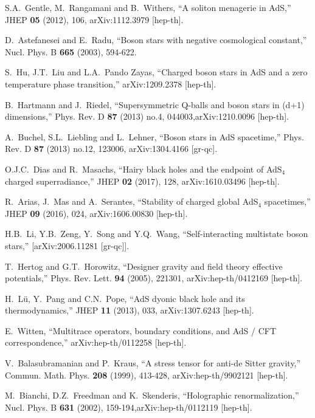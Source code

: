 \documentclass[11pt]{article}
\begin{document}
\begin{thebibliography}{99}
 S.A.~Gentle, M.~Rangamani and B.~Withers, ``A soliton menagerie in AdS,'' JHEP \textbf{05} (2012), 106, arXiv:1112.3979 [hep-th].

 D.~Astefanesei and E.~Radu, ``Boson stars with negative cosmological constant,'' Nucl.
Phys. B \textbf{665} (2003), 594-622.

 S.~Hu, J.T.~Liu and L.A.~Pando Zayas, ``Charged boson stars in AdS and a zero temperature phase
transition,'' arXiv:1209.2378 [hep-th].

 B.~Hartmann and J.~Riedel, ``Supersymmetric Q-balls and boson stars in (d+1) dimensions,''
Phys. Rev. D \textbf{87} (2013) no.4, 044003,arXiv:1210.0096 [hep-th].

 A.~Buchel, S.L.~Liebling and L.~Lehner, ``Boson stars in AdS spacetime,''
Phys. Rev. D \textbf{87} (2013) no.12, 123006, arXiv:1304.4166 [gr-qc].

 O.J.C.~Dias and R.~Masachs, ``Hairy black holes and the endpoint of AdS$_4$ charged
superradiance,'' JHEP \textbf{02} (2017), 128, arXiv:1610.03496 [hep-th].

 R.~Arias, J.~Mas and A.~Serantes, ``Stability of charged global AdS$_{4}$ spacetimes,'' JHEP
\textbf{09} (2016), 024, arXiv:1606.00830 [hep-th].

H.B.~Li, Y.B.~Zeng, Y.~Song and Y.Q.~Wang,
``Self-interacting multistate boson stars,''
[arXiv:2006.11281 [gr-qc]].

T.~Hertog and G.T.~Horowitz,
``Designer gravity and field theory effective potentials,''
Phys. Rev. Lett. \textbf{94} (2005), 221301, arXiv:hep-th/0412169 [hep-th].

H.~L\"u, Y.~Pang and C.N.~Pope,
``AdS dyonic black hole and its thermodynamics,''
JHEP \textbf{11} (2013), 033, arXiv:1307.6243 [hep-th].

E.~Witten,
``Multitrace operators, boundary conditions, and AdS / CFT correspondence,'' arXiv:hep-th/0112258 [hep-th].

V.~Balasubramanian and P.~Kraus,
``A stress tensor for anti-de Sitter gravity,''
Commun. Math. Phys. \textbf{208} (1999), 413-428, arXiv:hep-th/9902121 [hep-th].

M.~Bianchi, D.Z.~Freedman and K.~Skenderis,
``Holographic renormalization,''
Nucl. Phys. B \textbf{631} (2002), 159-194,arXiv:hep-th/0112119 [hep-th].


\end{thebibliography}
\end{document}
